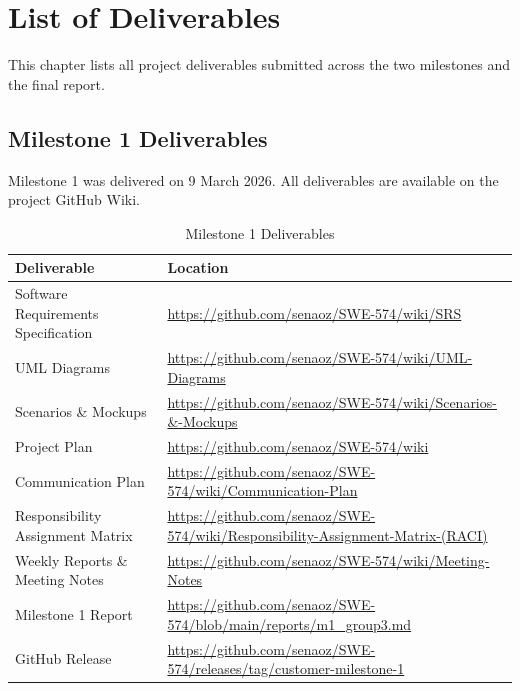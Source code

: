 \documentclass[10pt,a4paper]{report}
\begin{document}
\newpage
\tableofcontents
\newpage
\listoffigures
\newpage
\listoftables

\chapter{List of Deliverables}

This chapter lists all project deliverables submitted across the two milestones and the final report.

\section{Milestone 1 Deliverables}

Milestone 1 was delivered on 9 March 2026. All deliverables are available on the project GitHub Wiki.

\begin{table}[h]
    \centering
    \begin{tabularx}{\textwidth}{|l|X|}
        \hline
        \textbf{Deliverable}                  & \textbf{Location}                                                                          \\
        \hline
        Software Requirements Specification   & \url{https://github.com/senaoz/SWE-574/wiki/SRS}                                           \\
        \hline
        UML Diagrams                          & \url{https://github.com/senaoz/SWE-574/wiki/UML-Diagrams}                                  \\
        \hline
        Scenarios \& Mockups                  & \url{https://github.com/senaoz/SWE-574/wiki/Scenarios-\&-Mockups}                          \\
        \hline
        Project Plan                          & \url{https://github.com/senaoz/SWE-574/wiki}                                               \\
        \hline
        Communication Plan                    & \url{https://github.com/senaoz/SWE-574/wiki/Communication-Plan}                            \\
        \hline
        Responsibility Assignment Matrix      & \url{https://github.com/senaoz/SWE-574/wiki/Responsibility-Assignment-Matrix-(RACI)}        \\
        \hline
        Weekly Reports \& Meeting Notes       & \url{https://github.com/senaoz/SWE-574/wiki/Meeting-Notes}                                 \\
        \hline
        Milestone 1 Report                    & \url{https://github.com/senaoz/SWE-574/blob/main/reports/m1\_group3.md}                    \\
        \hline
        GitHub Release                        & \url{https://github.com/senaoz/SWE-574/releases/tag/customer-milestone-1}                  \\
        \hline
    \end{tabularx}
    \caption{Milestone 1 Deliverables}
\end{table}
\end{document}
